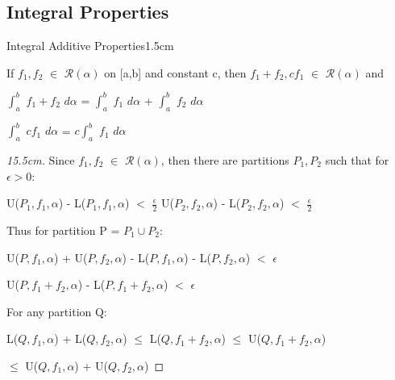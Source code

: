 \subsection{ Integral Properties }

    \begin{ltheorem}{Integral Additive Properties}{1.5cm}
        \item If $f_1,f_2$ $\in$ $\mathscr{R}(\alpha)$ on [a,b] and constant c,
        then $f_1 + f_2,cf_1$ $\in$ $\mathscr{R}(\alpha)$ and

            \hspace{0.5cm}
            $\int_a^b$ $f_1 + f_2$ $d\alpha$
            = $\int_a^b$ $f_1$ $d\alpha$ + $\int_a^b$ $f_2$ $d\alpha$

            \hspace{0.5cm}
            $\int_a^b$ $cf_1$ $d\alpha$ = $c \int_a^b$ $f_1$ $d\alpha$

            \begin{proof}[15.5cm]
                Since $f_1,f_2$ $\in$ $\mathscr{R}(\alpha)$, then there are
                partitions $P_1,P_2$ such that for $\epsilon > 0$:

                \hspace{0.5cm}
                U($P_1,f_1,\alpha$) - L($P_1,f_1,\alpha$) $<$ $\frac{\epsilon}{2}$
                \hspace{1cm}
                U($P_2,f_2,\alpha$) - L($P_2,f_2,\alpha$) $<$ $\frac{\epsilon}{2}$

                Thus for partition P = $P_1 \cup P_2$:

                \hspace{0.5cm}
                U($P,f_1,\alpha$) + U($P,f_2,\alpha$)
                - L($P,f_1,\alpha$) - L($P,f_2,\alpha$)
                $<$ $\epsilon$

                \hspace{0.5cm}
                U($P,f_1+f_2,\alpha$) - L($P,f_1+f_2,\alpha$) $<$ $\epsilon$

                For any partition Q:

                \hspace{0.5cm}
                L($Q,f_1,\alpha$) + L($Q,f_2,\alpha$)
                $\leq$ L($Q,f_1+f_2,\alpha$)
                $\leq$ U($Q,f_1+f_2,\alpha$)

                \hspace{5cm}
                $\leq$ U($Q,f_1,\alpha$) + U($Q,f_2,\alpha$)


\end{proof}
\end{ltheorem}
